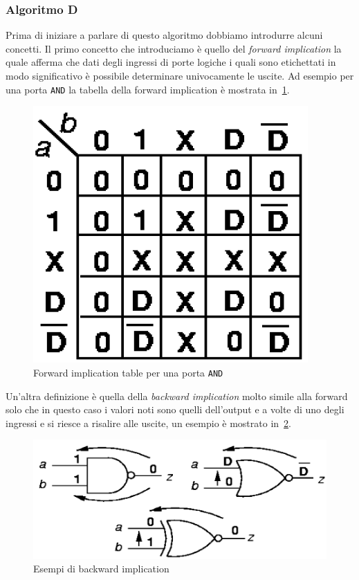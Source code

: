 \subsubsection{Algoritmo D}
Prima di iniziare a parlare di questo algoritmo dobbiamo introdurre alcuni concetti. Il primo concetto che introduciamo è quello del \emph{forward implication} la quale afferma che dati degli ingressi di porte logiche i quali sono etichettati in modo significativo è possibile determinare univocamente le uscite. Ad esempio per una porta \texttt{AND} la tabella della forward implication è mostrata in \figurename\,\ref{fig:forwardimp}.\\
\begin{figure}
\centering
\includegraphics[scale=0.4]{img/forwardimp.png}
\caption{Forward implication table per una porta \texttt{AND}}\label{fig:forwardimp}
\end{figure}
Un'altra definizione è quella della \emph{backward implication} molto simile alla forward solo che in questo caso i valori noti sono quelli dell'output e a volte di uno degli ingressi e si riesce a risalire alle uscite, un esempio è mostrato in \figurename\,\ref{fig:backwardimp}.\\
\begin{figure}
\centering
\includegraphics[scale=0.4]{img/backwardimp.png}
\caption{Esempi di backward implication}\label{fig:backwardimp}
\end{figure}
